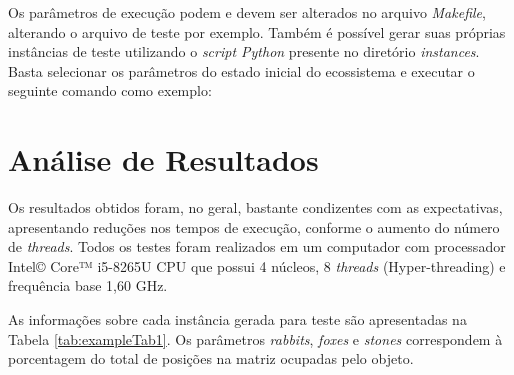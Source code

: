 \documentclass[a4paper, 12pt]{article}
\begin{document}
Os parâmetros de execução podem e devem ser alterados no arquivo \emph{Makefile}, alterando o arquivo de teste por exemplo. Também é possível gerar suas próprias instâncias de teste utilizando o \emph{script Python} presente no diretório \emph{instances}. Basta selecionar os parâmetros do estado inicial do ecossistema e executar o seguinte comando como exemplo:

\begin{center}
\end{center}

\section{Análise de Resultados}

Os resultados obtidos foram, no geral, bastante condizentes com as expectativas, apresentando reduções nos tempos de execução, conforme o aumento do número de \emph{threads}. Todos os testes foram realizados em um computador com processador Intel© Core™ i5-8265U CPU que possui 4 núcleos, 8 \emph{threads} (Hyper-threading) e frequência base 1,60 GHz.

As informações sobre cada instância gerada para teste são apresentadas na Tabela \ref{tab:exampleTab1}. Os parâmetros \emph{rabbits}, \emph{foxes} e \emph{stones} correspondem à porcentagem do total de posições na matriz ocupadas pelo objeto.
\vspace{-0.5cm}
\begin{table}[H]
    \centering
    \caption{Parâmetros das Instâncias de Teste}
    \label{tab:exampleTab1}
    \vspace{0.2cm}
\end{table}
\end{document}
